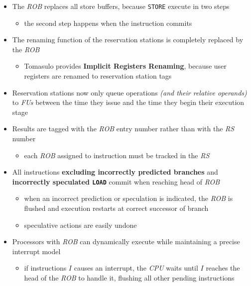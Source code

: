 \documentclass[english]{article}
\begin{document}
\begin{itemize}
  \item The \textit{ROB} replaces all store buffers, because \texttt{STORE} execute in two steps
        \begin{itemize}
          \item the second step happens when the instruction commits
        \end{itemize}
  \item The renaming function of the reservation stations is completely replaced by the \textit{ROB}
        \begin{itemize}
          \item Tomasulo provides \textbf{Implicit Registers Renaming}, because user registers are renamed to reservation station tags
        \end{itemize}
  \item Reservation stations now only queue operations \textit{(and their relative operands)} to \textit{FUs} between the time they issue and the time they begin their execution stage
  \item Results are tagged with the \textit{ROB} entry number rather than with the \textit{RS} number
        \begin{itemize}
          \item each \textit{ROB} assigned to instruction must be tracked in the \textit{RS}
        \end{itemize}
  \item All instructions \textbf{excluding incorrectly predicted branches} and \textbf{incorrectly speculated \texttt{LOAD}} commit when reaching head of \textit{ROB}
        \begin{itemize}
          \item when an incorrect prediction or speculation is indicated, the \textit{ROB} is flushed and execution restarts at correct successor of branch
          \item speculative actions are easily undone
        \end{itemize}
  \item Processors with \textit{ROB} can dynamically execute while maintaining a precise interrupt model
        \begin{itemize}
          \item if instructions \(I\) causes an interrupt, the \textit{CPU} waits until \(I\) reaches the head of the \textit{ROB} to handle it, flushing all other pending instructions
        \end{itemize}
\end{itemize}
\end{document}
